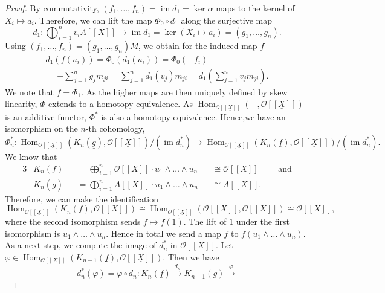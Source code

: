 \documentclass{article}
\theoremstyle{plain}%
\theoremstyle{definition}
\theoremstyle{remark}
\newcommand{\im}{\operatorname{im}}
\renewcommand{\hom}{\operatorname{Hom}}
\begin{document}
\begin{proof}
    By commutativity, \((f_1, \dots, f_n) = \im d_1 = \ker \alpha\) maps to the kernel of \(X_i \mapsto a_i\). Therefore, we can lift the map
    \(\Phi_0 \circ d_1\) along the surjective map 
    \[
        d_1 \colon \bigoplus_{i=1}^n v_i A[[\underline{X}]] \to \im d_1 = \ker(X_i \mapsto a_i) = (g_1, \dots, g_n).
    \]
    Using \((f_1, \dots, f_n) = (g_1, \dots, g_n)M\), we obtain for the induced map \(f\)
    \begin{multline*}
        d_1(f(u_i)) = \Phi_0(d_1(u_i)) = \Phi_0(-f_i)\\ = - \sum_{j=1}^n g_jm_{ji}
        = \sum_{j=1}^n d_1(v_j)m_{ji} = d_1\left(\sum_{j=1}^n v_j m_{ji}\right).
    \end{multline*}
    We note that \(f = \Phi_1\). 
    As the higher maps are then uniquely defined by skew linearity,  \(\Phi\) extends to a homotopy equivalence.
    As \(\hom_{\mathcal{O}[[\underline{X}]]}(-, \mathcal{O}[[\underline{X}]])\) is an additive functor, 
    \(\Phi^*\) is also a homotopy equivalence. Hence,we have an isomorphism on the \(n\)-th cohomology,
    \[
        \Phi_n^*\colon \hom_{\mathcal{O}[[\underline{X}]]}(K_n(\underline{g}), \mathcal{O}[[\underline{X}]])/(\im d_n^*)
        \to \hom_{\mathcal{O}[[\underline{X}]]}(K_n(\underline{f}), \mathcal{O}[[\underline{X}]])/(\im d_n^*).
    \]
    We know that 
    \begin{alignat*}{3}
        &K_n(\underline{f}) &&= \bigoplus_{i = 1}^n \mathcal{O}[[\underline{X}]] \cdot u_1\wedge\dots\wedge u_n
        &&\cong \mathcal{O}[[\underline{X}]]\qquad\text{ and}\\
        &K_n(\underline{g}) &&= \bigoplus_{i = 1}^n A[[\underline{X}]] \cdot u_1\wedge\dots\wedge u_n 
        &&\cong A[[\underline{X}]]. 
    \end{alignat*}
    Therefore, we can make the identification
    \[
        \hom_{\mathcal{O}[[\underline{X}]]}(K_n(\underline{f}), \mathcal{O}[[\underline{X}]])
        \cong \hom_{\mathcal{O}[[\underline{X}]]}(\mathcal{O}[[\underline{X}]], \mathcal{O}[[\underline{X}]])
        \cong \mathcal{O}[[\underline{X}]],
    \]
    where the second isomorphism sends \(f \mapsto f(1)\). The lift of \(1\) under the first isomorphism is 
    \(u_1\wedge\dots\wedge u_n\). Hence in total we send a map 
    \(f\) to \(f(u_1\wedge\dots\wedge u_n)\).
    As a next step, we compute the image of \(d_n^*\) in \(\mathcal{O}[[\underline{X}]]\).
    Let \(\varphi \in \hom_{\mathcal{O}[[\underline{X}]]}(K_{n-1}(\underline{f}), \mathcal{O}[[\underline{X}]])\).
    Then we have
    \[
        d_n^*(\varphi) = \varphi \circ d_n \colon K_n(\underline{f}) \xrightarrow{d_n} K_{n-1}(g) \xrightarrow{\varphi} 
\]
\end{proof}
\end{document}
